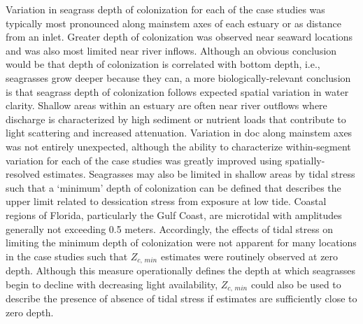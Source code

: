 \documentclass[letterpaper,12pt,oneside]{article}\usepackage[]{graphicx}\usepackage[]{color}
\begin{document}
Variation in seagrass depth of colonization for each of the case studies was typically most pronounced along mainstem axes of each estuary or as distance from an inlet.  Greater depth of colonization was observed near seaward locations and was also most limited near river inflows.  Although an obvious conclusion would be that depth of colonization is correlated with bottom depth, i.e., seagrasses grow deeper because they can, a more biologically-relevant conclusion is that seagrass depth of colonization follows expected spatial variation in water clarity.  Shallow areas within an estuary are often near river outflows where discharge is characterized by high sediment or nutrient loads that contribute to light scattering and increased attenuation.  Variation in \ac{doc} along mainstem axes was not entirely unexpected, although the ability to characterize within-segment variation for each of the case studies was greatly improved using spatially-resolved estimates.  Seagrasses may also be limited in shallow areas by tidal stress such that a `minimum' depth of colonization can be defined that describes the upper limit related to dessication stress from exposure at low tide.  Coastal regions of Florida, particularly the Gulf Coast, are microtidal with amplitudes generally not exceeding 0.5 meters.  Accordingly, the effects of tidal stress on limiting the minimum depth of colonization were not apparent for many locations in the case studies such that $Z_{c,\,min}$ estimates were routinely observed at zero depth.  Although this measure operationally defines the depth at which seagrasses begin to decline with decreasing light availability, $Z_{c,\,min}$ could also be used to describe the presence of absence of tidal stress if estimates are sufficiently close to zero depth.
\end{document}

